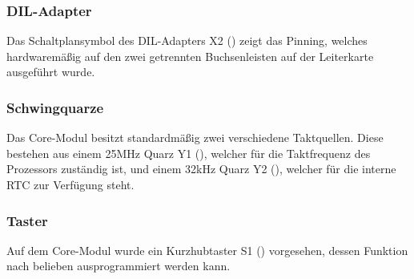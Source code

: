 
\subsubsection{DIL-Adapter}
Das Schaltplansymbol des DIL-Adapters X2 () zeigt das Pinning, welches hardwaremäßig auf den zwei getrennten Buchsenleisten auf der Leiterkarte ausgeführt wurde.


\subsubsection{Schwingquarze}
Das \gls{Core-Modul} besitzt standardmäßig zwei verschiedene Taktquellen. Diese bestehen aus einem 25MHz Quarz Y1 (), welcher für die Taktfrequenz des Prozessors zuständig ist, und einem 32kHz Quarz Y2 (), welcher für die interne \gls{RTC} zur Verfügung steht.


\subsubsection{Taster}
Auf dem \gls{Core-Modul} wurde ein Kurzhubtaster S1 () vorgesehen, dessen Funktion nach belieben ausprogrammiert werden kann.

